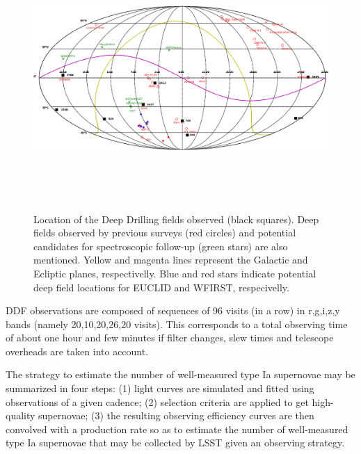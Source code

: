\documentclass [11pt,a4paper]{article}
\begin{document}
\begin{figure}[htbp]
\begin{center}
\includegraphics[width=14cm,height=10cm]{Figures/All.png}
\caption{Location of the Deep Drilling fields observed (black squares). Deep fields observed by previous surveys (red circles) and potential candidates for spectroscopic follow-up (green stars) are also mentioned. Yellow and magenta lines represent the Galactic and Ecliptic planes, respectivelly. Blue and red stars indicate potential deep field locations for EUCLID and WFIRST, respecivelly.}\label{fig:ddf_map}
\end{center}
\end{figure}

DDF observations are composed of sequences of 96 visits (in a row) in r,g,i,z,y bands (namely 20,10,20,26,20 visits). This corresponds to a total observing time of about one hour and few minutes if filter changes, slew times and telescope overheads are taken into account.

The strategy to estimate the number of well-measured type Ia supernovae may be summarized in four steps: (1) light curves are simulated and fitted using observations of a given cadence; (2) selection criteria are applied to get high-quality supernovae; (3) the resulting observing efficiency curves are then convolved with a production rate \cite{perrett} so as to estimate the number of well-measured type Ia supernovae that may be collected by LSST given an observing strategy. 
\end{document}
